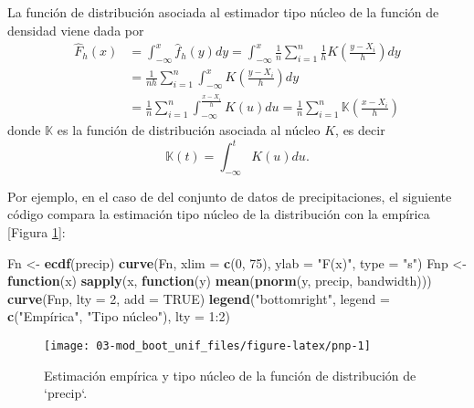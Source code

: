 \documentclass[
]{book}
\newenvironment{Shaded}{\begin{snugshade}}{\end{snugshade}}
\newcommand{\ControlFlowTok}[1]{\textcolor[rgb]{0.13,0.29,0.53}{\textbf{#1}}}
\newcommand{\DataTypeTok}[1]{\textcolor[rgb]{0.13,0.29,0.53}{#1}}
\newcommand{\DecValTok}[1]{\textcolor[rgb]{0.00,0.00,0.81}{#1}}
\newcommand{\KeywordTok}[1]{\textcolor[rgb]{0.13,0.29,0.53}{\textbf{#1}}}
\newcommand{\NormalTok}[1]{#1}
\newcommand{\OtherTok}[1]{\textcolor[rgb]{0.56,0.35,0.01}{#1}}
\newcommand{\StringTok}[1]{\textcolor[rgb]{0.31,0.60,0.02}{#1}}
\theoremstyle{break}
\theoremstyle{definition}
\theoremstyle{definition}
\theoremstyle{definition}
\theoremstyle{remark}
\begin{document}
La función de distribución asociada al estimador tipo núcleo de la
función de densidad viene dada por
\[\begin{aligned}
\hat{F}_{h}\left( x \right) &= \int_{-\infty }^{x}\hat{f}_{h}\left( y \right) dy
=\int_{-\infty }^{x}\frac{1}{n}\sum_{i=1}^{n}\frac{1}{h}
K\left( \frac{y-X_i}{h} \right) dy \\
&= \frac{1}{nh}\sum_{i=1}^{n}\int_{-\infty }^{x}
K\left( \frac{y-X_i}{h} \right) dy \\
&= \frac{1}{n}\sum_{i=1}^{n}\int_{-\infty }^{\frac{x-X_i}{h}}K\left( u \right) du
=\frac{1}{n}\sum_{i=1}^{n}\mathbb{K}\left( \frac{x-X_i}{h} \right)
\end{aligned}\]
donde \(\mathbb{K}\) es la función de distribución
asociada al núcleo \(K\), es decir
\[\mathbb{K}\left( t \right) =\int_{-\infty }^{t}K\left(
u \right) du.\]

Por ejemplo, en el caso de del conjunto de datos de precipitaciones, el siguiente código compara la estimación tipo núcleo de la distribución con la empírica {[}Figura \ref{fig:pnp}{]}:

\begin{Shaded}
\begin{Highlighting}[]
\NormalTok{Fn <-}\StringTok{ }\KeywordTok{ecdf}\NormalTok{(precip)}
\KeywordTok{curve}\NormalTok{(Fn, }\DataTypeTok{xlim =} \KeywordTok{c}\NormalTok{(}\DecValTok{0}\NormalTok{, }\DecValTok{75}\NormalTok{), }\DataTypeTok{ylab =} \StringTok{"F(x)"}\NormalTok{, }\DataTypeTok{type =} \StringTok{"s"}\NormalTok{)}
\NormalTok{Fnp <-}\StringTok{ }\ControlFlowTok{function}\NormalTok{(x) }\KeywordTok{sapply}\NormalTok{(x, }\ControlFlowTok{function}\NormalTok{(y) }\KeywordTok{mean}\NormalTok{(}\KeywordTok{pnorm}\NormalTok{(y, precip, bandwidth)))}
\KeywordTok{curve}\NormalTok{(Fnp, }\DataTypeTok{lty =} \DecValTok{2}\NormalTok{, }\DataTypeTok{add =} \OtherTok{TRUE}\NormalTok{) }
\KeywordTok{legend}\NormalTok{(}\StringTok{"bottomright"}\NormalTok{, }\DataTypeTok{legend =} \KeywordTok{c}\NormalTok{(}\StringTok{"Empírica"}\NormalTok{, }\StringTok{"Tipo núcleo"), lty = 1:2)}
\end{Highlighting}
\end{Shaded}

\begin{figure}[!htb]

{\centering \texttt{[image: 03-mod\_boot\_unif\_files/figure-latex/pnp-1]} 

}

\caption{Estimación empírica y tipo núcleo de la función de distribución de `precip`. }\label{fig:pnp}
\end{figure}
\end{document}
